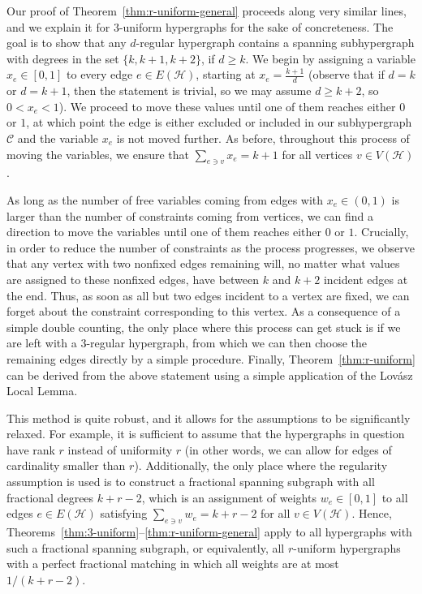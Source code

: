 \documentclass[11pt, a4paper]{article}
\numberwithin{theorem}{section} %
\theoremstyle{remark}
\theoremstyle{definition}
\def\cC{\mathcal{C}}
\def\cH{\mathcal{H}}
\begin{document}
Our proof of Theorem~\ref{thm:r-uniform-general} proceeds along very similar lines, and we explain it for $3$-uniform hypergraphs for the sake of concreteness. The goal is to show that any $d$-regular hypergraph contains a spanning subhypergraph with degrees in the set $\{k, k+1, k+2\}$, if $d\geq k$. We begin by assigning a variable $x_e\in [0, 1]$ to every edge $e\in E(\cH)$, starting at $x_e=\frac{k+1}{d}$ (observe that if $d=k$ or $d=k+1$, then the statement is trivial, so we may assume $d\geq k+2$, so $0<x_e<1$). We proceed to move these values until one of them reaches either $0$ or $1$, at which point the edge is either excluded or included in our subhypergraph $\cC$ and the variable $x_e$ is not moved further. As before, throughout this process of moving the variables, we ensure that $\sum_{e\ni v}x_e=k+1$ for all vertices $v\in V(\cH)$.

As long as the number of free variables coming from edges with $x_e\in (0, 1)$ is larger than the number of constraints coming from vertices, we can find a direction to move the variables until one of them reaches either $0$ or $1$. Crucially, in order to reduce the number of constraints as the process progresses, we observe that any vertex with two nonfixed edges remaining will, no matter what values are assigned to these nonfixed edges, have between $k$ and $k+2$ incident edges at the end. Thus, as soon as all but two edges incident to a vertex are fixed, we can forget about the constraint corresponding to this vertex. As a consequence of a simple double counting, the only place where this process can get stuck is if we are left with a $3$-regular hypergraph, from which we can then choose the remaining edges directly by a simple procedure. Finally, Theorem~\ref{thm:r-uniform} can be derived from the above statement using a simple application of the Lov\'asz Local Lemma.

This method is quite robust, and it allows for the assumptions to be 
significantly relaxed. For example, it is sufficient to assume that 
the hypergraphs in question have rank $r$ instead of uniformity $r$ 
(in other words, we can allow for edges of cardinality smaller than $r$). 
Additionally, the only place where the regularity assumption is used 
is to construct a fractional spanning subgraph with all
fractional degrees $k+r-2$, which is an assignment of weights 
$w_e\in [0, 1]$ to all edges $e\in E(\cH)$ satisfying 
$\sum_{e\ni v} w_e=k+r-2$ for all $v\in V(\cH)$. 
Hence, Theorems~\ref{thm:3-uniform}--\ref{thm:r-uniform-general} apply
to all hypergraphs with such a fractional spanning subgraph, or
equivalently, all $r$-uniform hypergraphs with a
perfect fractional matching in which all weights are
at most $1/(k+r-2)$.
\end{document}
